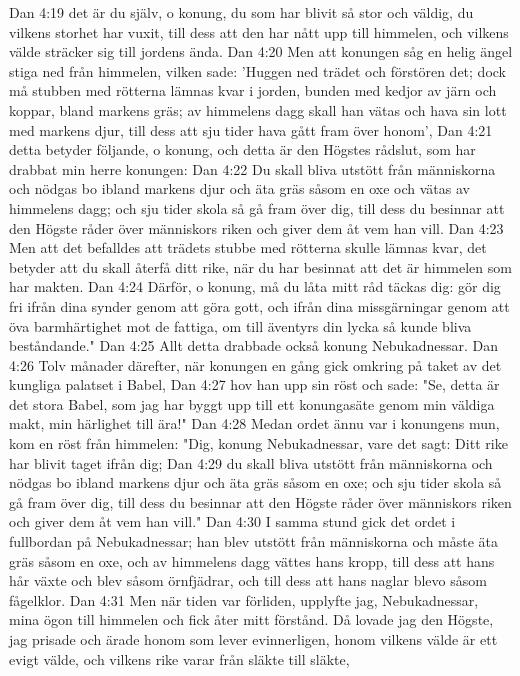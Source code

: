 Dan 4:19  det är du själv, o konung, du som har blivit så stor och väldig, du vilkens storhet har vuxit, till dess att den har nått upp till himmelen, och vilkens välde sträcker sig till jordens ända.
Dan 4:20  Men att konungen såg en helig ängel stiga ned från himmelen, vilken sade: 'Huggen ned trädet och förstören det; dock må stubben med rötterna lämnas kvar i jorden, bunden med kedjor av järn och koppar, bland markens gräs; av himmelens dagg skall han vätas och hava sin lott med markens djur, till dess att sju tider hava gått fram över honom',
Dan 4:21  detta betyder följande, o konung, och detta är den Högstes rådslut, som har drabbat min herre konungen:
Dan 4:22  Du skall bliva utstött från människorna och nödgas bo ibland markens djur och äta gräs såsom en oxe och vätas av himmelens dagg; och sju tider skola så gå fram över dig, till dess du besinnar att den Högste råder över människors riken och giver dem åt vem han vill.
Dan 4:23  Men att det befalldes att trädets stubbe med rötterna skulle lämnas kvar, det betyder att du skall återfå ditt rike, när du har besinnat att det är himmelen som har makten.
Dan 4:24  Därför, o konung, må du låta mitt råd täckas dig: gör dig fri ifrån dina synder genom att göra gott, och ifrån dina missgärningar genom att öva barmhärtighet mot de fattiga, om till äventyrs din lycka så kunde bliva beståndande."
Dan 4:25  Allt detta drabbade också konung Nebukadnessar.
Dan 4:26  Tolv månader därefter, när konungen en gång gick omkring på taket av det kungliga palatset i Babel,
Dan 4:27  hov han upp sin röst och sade: "Se, detta är det stora Babel, som jag har byggt upp till ett konungasäte genom min väldiga makt, min härlighet till ära!"
Dan 4:28  Medan ordet ännu var i konungens mun, kom en röst från himmelen: "Dig, konung Nebukadnessar, vare det sagt: Ditt rike har blivit taget ifrån dig;
Dan 4:29  du skall bliva utstött från människorna och nödgas bo ibland markens djur och äta gräs såsom en oxe; och sju tider skola så gå fram över dig, till dess du besinnar att den Högste råder över människors riken och giver dem åt vem han vill."
Dan 4:30  I samma stund gick det ordet i fullbordan på Nebukadnessar; han blev utstött från människorna och måste äta gräs såsom en oxe, och av himmelens dagg vättes hans kropp, till dess att hans hår växte och blev såsom örnfjädrar, och till dess att hans naglar blevo såsom fågelklor.
Dan 4:31  Men när tiden var förliden, upplyfte jag, Nebukadnessar, mina ögon till himmelen och fick åter mitt förstånd. Då lovade jag den Högste, jag prisade och ärade honom som lever evinnerligen, honom vilkens välde är ett evigt välde, och vilkens rike varar från släkte till släkte,
